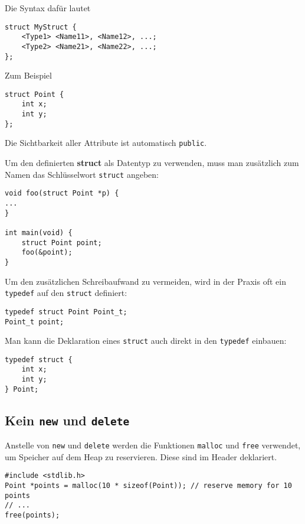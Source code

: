 Die Syntax dafür lautet

\begin{lstlisting}
struct MyStruct {
	<Type1> <Name11>, <Name12>, ...;
	<Type2> <Name21>, <Name22>, ...;
};
\end{lstlisting}

Zum Beispiel

\begin{lstlisting}
struct Point {
	int x;
	int y;
};
\end{lstlisting}

Die Sichtbarkeit aller Attribute ist automatisch \lstinline{public}.

Um den definierten \textbf{struct} als Datentyp zu verwenden, muss man zusätzlich zum Namen das Schlüsselwort \lstinline{struct} angeben:

\begin{lstlisting}
void foo(struct Point *p) {
...
}

int main(void) {
	struct Point point;
	foo(&point);
}
\end{lstlisting}

Um den zusätzlichen Schreibaufwand zu vermeiden, wird in der Praxis oft ein \lstinline{typedef} auf den \lstinline{struct} definiert:

\begin{lstlisting}
typedef struct Point Point_t;
Point_t point;
\end{lstlisting}

Man kann die Deklaration eines \lstinline{struct} auch direkt in den \lstinline{typedef} einbauen:

\begin{lstlisting}
typedef struct {
	int x;
	int y;
} Point;
\end{lstlisting}

\subsection{Kein \lstinline{new} und \lstinline{delete}}

Anstelle von \lstinline{new} und \lstinline{delete} werden die Funktionen \lstinline{malloc} und \lstinline{free} verwendet, um Speicher auf dem Heap zu reservieren.
Diese sind im Header  deklariert.

\begin{lstlisting}
#include <stdlib.h>
Point *points = malloc(10 * sizeof(Point)); // reserve memory for 10 points
// ...
free(points);
\end{lstlisting}

